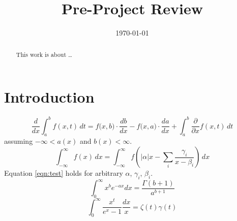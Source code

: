 \documentclass[sotoncolour]{uosarticle}
\title       {Pre-Project Review}
\date        {\today}
\begin{document}
\frontmatter
\maketitle
\begin{abstract}
This work is about \dots
\end{abstract}

\mainmatter

\section{Introduction} \label{sec:Introduction}
\blindtext[2]
		\[{\frac{d}{dx}} \int _{a}^{b} f(x,t)\,dt = f{\big (}x, b{\big )} \cdot {\frac {db}{dx}} - f{\big (}x, a{\big )} \cdot {\frac{da}{dx}} + \int _{a}^{b}{\frac{\partial}{\partial x}} f(x,t)\,dt\]
		assuming \(-\infty < a(x)\) and \(b(x) < \infty\).
\blindtext[1]
\begin{equation}\label{eqn:test}
		\int_{-\infty}^{\infty} f(x)\,dx = \int_{-\infty}^{\infty} f(|\alpha| x - \sum_{i}\frac{\gamma_i}{x - \beta_i})\,dx
\end{equation}
	Equation \ref{eqn:test} holds for arbitrary \(\alpha\), \(\gamma_i\), \(\beta_i\).
\blindtext[1]
\begin{equation}
	\int_{0}^{\infty} x^b e^{-a x} dx = \frac{\Gamma(b+1)}{a^{b+1}}
\end{equation}
\begin{equation}
	\int_{0}^{\infty} \frac{x^t}{e^x - 1} \frac{dx}{x} = \zeta(t) \gamma(t)
\end{equation}
\blindtext[1]
\end{document}
